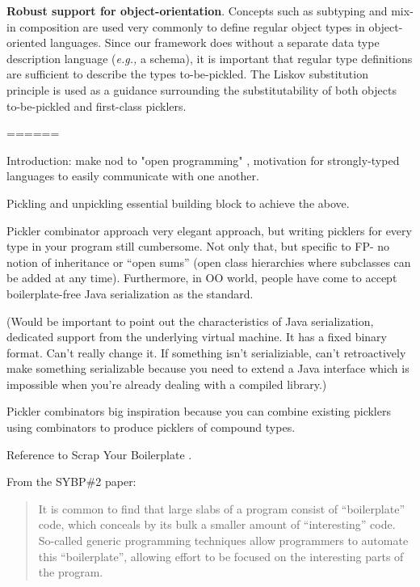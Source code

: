 \documentclass[preprint,10pt]{sigplanconf}
\begin{document}
\begin{itemize}
{\bf Robust support for object-orientation}. Concepts such as subtyping and
mix-in composition are used very commonly to define regular object types in
object-oriented languages. Since our framework does without a separate data
type description language ({\em e.g.,} a schema), it is important that regular
type definitions are sufficient to describe the types to-be-pickled. The
Liskov substitution principle is used as a guidance surrounding the
substitutability of both objects to-be-pickled and first-class picklers.
\end{itemize}



======

Introduction: make nod to "open programming" \cite{Rossberg2007}, motivation for strongly-typed languages to easily communicate with one another.

Pickling and unpickling essential building block to achieve the above.

Pickler combinator approach \cite{Kennedy2004} very elegant approach, but writing picklers for every type in your program still cumbersome. Not only that, but specific to FP- no notion of inheritance or ``open sums'' (open class hierarchies where subclasses can be added at any time). Furthermore, in OO world, people have come to accept boilerplate-free Java serialization as the standard.

(Would be important to point out the characteristics of Java serialization, dedicated support from the underlying virtual machine. It has a fixed binary format. Can't really change it. If something isn't serializiable, can't retroactively make something serializable because you need to extend a Java interface which is impossible when you're already dealing with a compiled library.)

Pickler combinators big inspiration because you can combine existing picklers using combinators to produce picklers of compound types.

Reference to Scrap Your Boilerplate \cite{Lammel2004}.

From the SYBP\#2 paper:
\begin{quote}
It is common to find that large slabs of a program consist of ``boilerplate'' code, which conceals by its bulk a smaller amount of ``interesting'' code. So-called generic programming techniques allow programmers to automate this ``boilerplate'', allowing effort to be focused on the interesting parts of the program.
\end{quote}
\end{document}
